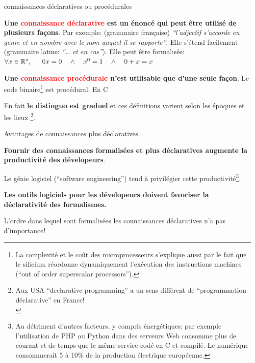 \documentclass[final,a4,xcolor={svgnames,dvipsnames}]{beamer}
\begin{document}
 \begin{frame}{connaissances déclaratives ou procédurales}

   \textbf{Une \textcolor{red}{connaissance déclarative} est un énoncé qui peut être utilisé de
   plusieurs façons}. Par exemple: (grammaire française)
   \textit{``l'adjectif s'accorde en genre et en nombre avec le nom
     auquel il se rapporte''}. Elle s'étend facilement (grammaire
   latine: \textit{``\ldots\! et en cas''}). Elle peut être formalisée:
   $\forall x \in \mathbb{R}^{*}, \hspace{1.5em} 0x = 0  \hspace{1.em} \wedge \hspace{1.em} x^0 = 1 \hspace{1.em}  \wedge \hspace{1.em} 0+x = x$

   \bigskip

   \textbf{Une \textcolor{red}{connaissance procédurale} n'est
     utilisable que d'une seule façon}.
   Le code binaire\footnote{La
   complexité et le coût des microprocesseurs s'explique aussi par le
   fait que le silicium réordonne dynamiquement l'exécution des
   instructions machines (``out of order superscalar processors'').}
   est  procédural. En C
{}


   \smallskip

En fait \textbf{le distinguo est graduel} et ces définitions
varient selon les époques et les lieux
\footnote{Aux USA
 ``declarative programming'' a un sens différent de ``programmation
 déclarative'' en France!\\}.
 \end{frame}

 \begin{frame}{Avantages de connaissances plus déclaratives}
     
   \textbf{Fournir des connaissances formalisées et plus déclaratives
     augmente la productivité des dévelopeurs}.

   \bigskip

   Le génie logiciel (``software engineering'') tend à privilégier
   cette productivité\footnote{Au détriment d'autres facteurs, y
   compris énergétiques: par exemple l'utilisation de PHP ou Python dans des
   serveurs Web consomme plus de courant et de temps que le même
   service codé en C et compilé. Le numérique consommerait 5 à 10\% de la
   production électrique européenne.\medskip}.

   \bigskip
   
   \textbf{Les outils logiciels pour les dévelopeurs doivent favoriser
     la déclarativité des formalismes.}

   \bigskip

   L'ordre dans lequel sont formalisées les connaissances déclaratives n'a pas d'importance!
 \end{frame}
\end{document}
